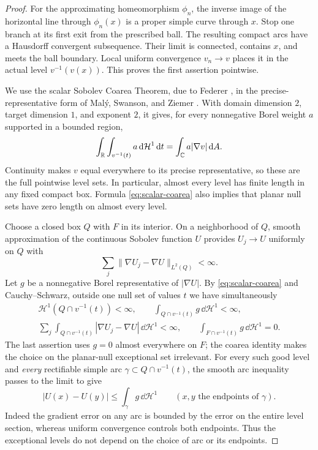 \begin{proof}
For the approximating homeomorphism $\phi_n$, the inverse image of the
horizontal line through $\phi_n(x)$ is a proper simple curve through
$x$. Stop one branch at its first exit from the prescribed ball.
The resulting compact arcs have a Hausdorff convergent subsequence.
Their limit is connected, contains $x$, and meets the ball boundary.
Local uniform convergence $v_n\to v$ places it in the actual level
$v^{-1}(v(x))$. This proves the first assertion pointwise.

We use the scalar Sobolev Coarea Theorem, due to Federer
\cite{Federer1969}, in the precise-representative form of
Mal\'y, Swanson, and Ziemer \cite[Theorem~1.1]{MSZ2003}. With domain dimension $2$, target
dimension $1$, and exponent $2$, it gives, for every nonnegative Borel
weight $a$ supported in a bounded region,
\begin{equation}\label{eq:scalar-coarea}
 \int_{\mathbb R}\int_{v^{-1}(t)}a\,\mathrm d\mathcal H^1\,\mathrm d t
   =\int_{\mathbb C}a|\nabla v|\,\mathrm d A.
\end{equation}
Continuity makes $v$ equal everywhere to its precise representative,
so these are the full pointwise level sets. In particular, almost every
level has finite length in any fixed compact box. Formula
\eqref{eq:scalar-coarea} also implies that planar null sets have zero
length on almost every level.

Choose a closed box $Q$ with $F$ in its interior. On a neighborhood of
$Q$, smooth approximation of the continuous Sobolev function $U$
provides $U_j\to U$ uniformly on $Q$ with
\[
 \sum_j\|\nabla U_j-\nabla U\|_{L^2(Q)}<\infty.
\]
Let $g$ be a nonnegative Borel representative of $|\nabla U|$.
By \eqref{eq:scalar-coarea} and Cauchy--Schwarz, outside one null set
of values $t$ we have simultaneously
\begin{gather*}
 \mathcal H^1(Q\cap v^{-1}(t))<\infty,\qquad
 \int_{Q\cap v^{-1}(t)}g\,\dd\mathcal H^1<\infty,\\
 \sum_j\int_{Q\cap v^{-1}(t)}
       |\nabla U_j-\nabla U|\,\dd\mathcal H^1<\infty,
 \qquad
 \int_{F\cap v^{-1}(t)}g\,\dd\mathcal H^1=0.
\end{gather*}
The last assertion uses $g=0$ almost everywhere on $F$; the coarea
identity makes the choice on the planar-null exceptional set
irrelevant. For every such good level and \emph{every} rectifiable
simple arc $\gamma\subset Q\cap v^{-1}(t)$, the smooth arc inequality
passes to the limit to give
\begin{equation}\label{eq:level-arc}
 |U(x)-U(y)|\le\int_\gamma g\,\dd\mathcal H^1
 \qquad(x,y\text{ the endpoints of }\gamma).
\end{equation}
Indeed the gradient error on any arc is bounded by the error on the
entire level section, whereas uniform convergence controls both
endpoints. Thus the exceptional levels do not depend on the choice of
arc or its endpoints.


\end{proof}
